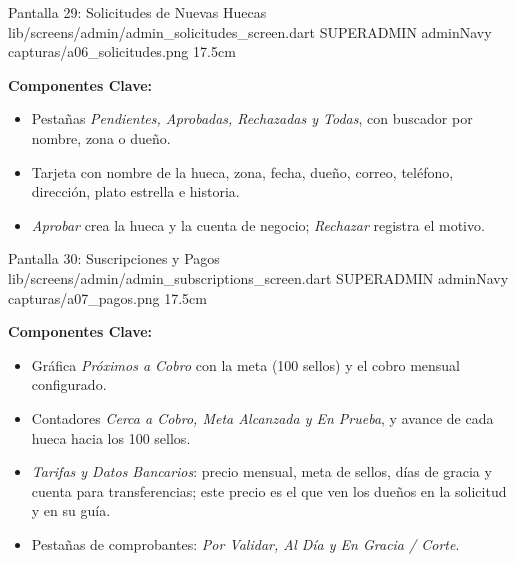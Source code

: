 \pantallashowcase
  {Pantalla 29: Solicitudes de Nuevas Huecas}
  {lib/screens/admin/admin_solicitudes_screen.dart}
  {SUPERADMIN}
  {adminNavy}
  {capturas/a06_solicitudes.png}
  {17.5cm}
  {

    \textbf{Componentes Clave:}
    \begin{itemize}[leftmargin=*, itemsep=2pt]
      \item Pestañas \textit{Pendientes, Aprobadas, Rechazadas y Todas}, con buscador por nombre, zona o dueño.
      \item Tarjeta con nombre de la hueca, zona, fecha, dueño, correo, teléfono, dirección, plato estrella e historia.
      \item \textit{Aprobar} crea la hueca y la cuenta de negocio; \textit{Rechazar} registra el motivo.
    \end{itemize}
  }

\pantallashowcase
  {Pantalla 30: Suscripciones y Pagos}
  {lib/screens/admin/admin_subscriptions_screen.dart}
  {SUPERADMIN}
  {adminNavy}
  {capturas/a07_pagos.png}
  {17.5cm}
  {

    \textbf{Componentes Clave:}
    \begin{itemize}[leftmargin=*, itemsep=2pt]
      \item Gráfica \textit{Próximos a Cobro} con la meta (100 sellos) y el cobro mensual configurado.
      \item Contadores \textit{Cerca a Cobro, Meta Alcanzada y En Prueba}, y avance de cada hueca hacia los 100 sellos.
      \item \textit{Tarifas y Datos Bancarios}: precio mensual, meta de sellos, días de gracia y cuenta para transferencias; este precio es el que ven los dueños en la solicitud y en su guía.
      \item Pestañas de comprobantes: \textit{Por Validar, Al Día y En Gracia / Corte}.
    \end{itemize}
  }


